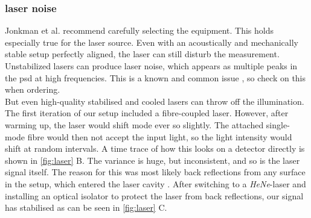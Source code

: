    \subsubsection{laser noise}
    \label{sec:laser}
        Jonkman et al. \cite{jonkman2020tutorial} recommend carefully selecting the equipment. This holds especially true for the laser source. Even with an acoustically and mechanically stable setup perfectly aligned, the laser can still disturb the measurement. Unstabilized lasers can produce laser noise, which appears as multiple peaks in the \gls{psd} at high frequencies. This is a known and common issue \cite{paschotta2009noise}, so check on this when ordering. \\ 
        But even high-quality stabilised and cooled lasers can throw off the illumination. The first iteration of our setup included a fibre-coupled laser. However, after warming up, the laser would shift mode ever so slightly. The attached single-mode fibre would then not accept the input light, so the light intensity would shift at random intervals. A time trace of how this looks on a detector directly is shown in \cref{fig:laser} B. The variance is huge, but inconsistent, and so is the laser signal itself. The reason for this was most likely back reflections from any surface in the setup, which entered the laser cavity \cite{heumier2003applnote}. After switching to a \textsl{HeNe}-laser and installing an optical isolator to protect the laser from back reflections, our signal has stabilised as can be seen in \cref{fig:laser} C.

